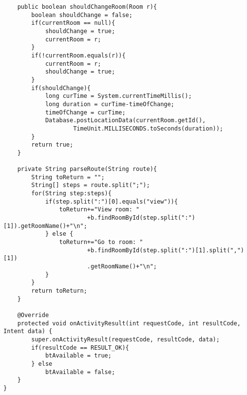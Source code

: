 \begin{lstlisting}
    public boolean shouldChangeRoom(Room r){
        boolean shouldChange = false;
        if(currentRoom == null){
            shouldChange = true;
            currentRoom = r;
        }
        if(!currentRoom.equals(r)){
            currentRoom = r;
            shouldChange = true;
        }
        if(shouldChange){
            long curTime = System.currentTimeMillis();
            long duration = curTime-timeOfChange;
            timeOfChange = curTime;
            Database.postLocationData(currentRoom.getId(),
                    TimeUnit.MILLISECONDS.toSeconds(duration));
        }
        return true;
    }

    private String parseRoute(String route){
        String toReturn = "";
        String[] steps = route.split(";");
        for(String step:steps){
            if(step.split(":")[0].equals("view")){
                toReturn+="View room: "
                        +b.findRoomById(step.split(":")[1]).getRoomName()+"\n";
            } else {
                toReturn+="Go to room: "
                        +b.findRoomById(step.split(":")[1].split(",")[1])
                        .getRoomName()+"\n";
            }
        }
        return toReturn;
    }

    @Override
    protected void onActivityResult(int requestCode, int resultCode, Intent data) {
        super.onActivityResult(requestCode, resultCode, data);
        if(resultCode == RESULT_OK){
            btAvailable = true;
        } else
            btAvailable = false;
    }
}
\end{lstlisting}
\newpage
